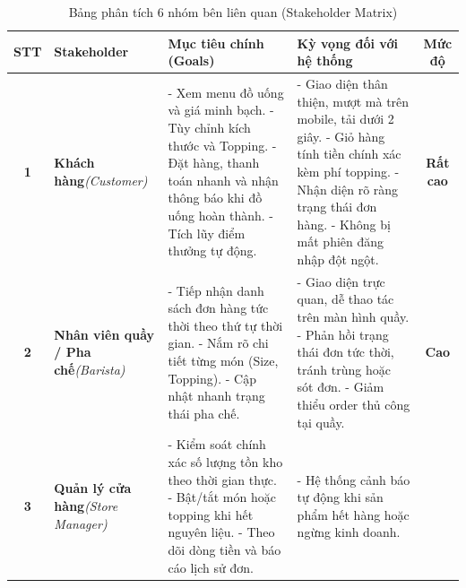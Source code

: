 \documentclass[12pt,a4paper]{article}
\begin{document}
\begin{table}[H]
\centering
\caption{Bảng phân tích 6 nhóm bên liên quan (Stakeholder Matrix)}
\label{tab:stakeholders}
\vspace{0.2cm}
\small
\renewcommand{\arraystretch}{1.3}
\begin{tabularx}{\textwidth}{|c|>{\raggedright\arraybackslash}p{2.8cm}|>{\raggedright\arraybackslash}X|>{\raggedright\arraybackslash}X|c|}
\hline
\rowcolor{tableheader}
\textbf{STT} & \textbf{Stakeholder} & \textbf{Mục tiêu chính (Goals)} & \textbf{Kỳ vọng đối với hệ thống} & \textbf{Mức độ} \\
\hline
\textbf{1} & \textbf{Khách hàng}\newline\textit{(Customer)} & 
- Xem menu đồ uống và giá minh bạch.\newline
- Tùy chỉnh kích thước và Topping.\newline
- Đặt hàng, thanh toán nhanh và nhận thông báo khi đồ uống hoàn thành.\newline
- Tích lũy điểm thưởng tự động. & 
- Giao diện thân thiện, mượt mà trên mobile, tải dưới 2 giây.\newline
- Giỏ hàng tính tiền chính xác kèm phí topping.\newline
- Nhận diện rõ ràng trạng thái đơn hàng.\newline
- Không bị mất phiên đăng nhập đột ngột. & 
\textbf{Rất cao} \\
\hline
\textbf{2} & \textbf{Nhân viên quầy / Pha chế}\newline\textit{(Barista)} & 
- Tiếp nhận danh sách đơn hàng tức thời theo thứ tự thời gian.\newline
- Nắm rõ chi tiết từng món (Size, Topping).\newline
- Cập nhật nhanh trạng thái pha chế. & 
- Giao diện trực quan, dễ thao tác trên màn hình quầy.\newline
- Phản hồi trạng thái đơn tức thời, tránh trùng hoặc sót đơn.\newline
- Giảm thiểu order thủ công tại quầy. & 
\textbf{Cao} \\
\hline
\textbf{3} & \textbf{Quản lý cửa hàng}\newline\textit{(Store Manager)} & 
- Kiểm soát chính xác số lượng tồn kho theo thời gian thực.\newline
- Bật/tắt món hoặc topping khi hết nguyên liệu.\newline
- Theo dõi dòng tiền và báo cáo lịch sử đơn. & 
- Hệ thống cảnh báo tự động khi sản phẩm hết hàng hoặc ngừng kinh doanh.\newline

\end{tabularx}
\end{table}
\end{document}
